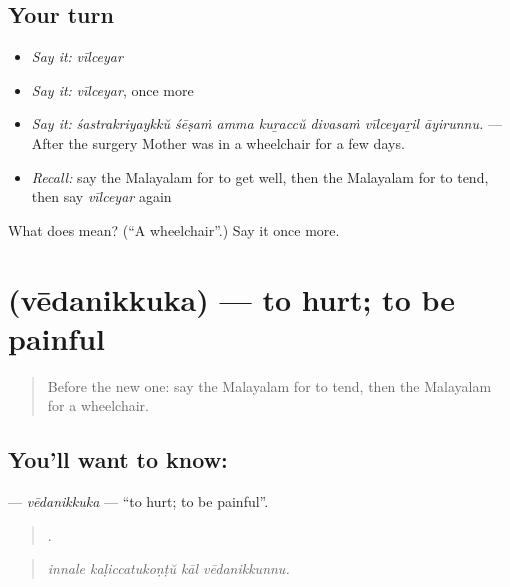 \subsection*{Your turn}
\begin{itemize}
\raggedright
  \item \emph{Say it:} \emph{vīlceyar}
  \item \emph{Say it:} \emph{vīlceyar}, once more
  \item \emph{Say it:} \emph{śastrakriyaykkŭ śēṣaṁ amma kuṟaccŭ divasaṁ vīlceyaṟil āyirunnu.} — After the surgery Mother was in a wheelchair for a few days.
  \item \emph{Recall:} say the Malayalam for to get well, then the Malayalam for to tend, then say \emph{vīlceyar} again
\end{itemize}

\begin{tcolorbox}[breakable,colback=teal!4,colframe=teal!35!black,title={Before you move on}]
What does  mean? (\textquotedblleft{}A wheelchair\textquotedblright{}.) Say it once more.
\end{tcolorbox}
\section[\texorpdfstring{\ml{വേദനിക്കുക} (vēdanikkuka)}{വേദനിക്കുക (vēdanikkuka)}]{ (vēdanikkuka) — to hurt; to be painful}

\label{lesson:ML-C538-vedanikkuka}



\begin{quote}
Before the new one: say the Malayalam for to tend, then the Malayalam for a wheelchair.
\end{quote}

\subsection*{You'll want to know: }
\textbf{} — \emph{vēdanikkuka} — \textquotedblleft{}to hurt; to be painful\textquotedblright{}.

\begin{quote}
   .
\end{quote}

\begin{quote}
\emph{innale kaḷiccatukoṇṭŭ kāl vēdanikkunnu.}
\end{quote}


